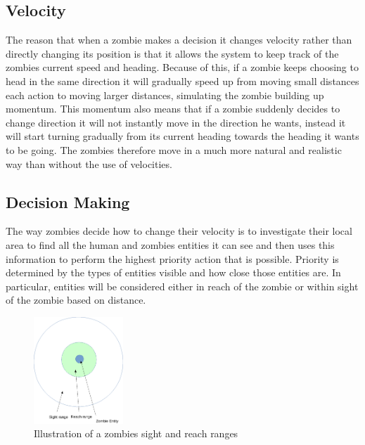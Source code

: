 \subsection{Velocity}
The reason that when a zombie makes a decision it changes velocity rather than directly changing its position is that it allows the system to keep track of the zombies current speed and heading. Because of this, if a zombie keeps choosing to head in the same direction it will gradually speed up from moving small distances each action to moving larger distances, simulating the zombie building up momentum. This momentum also means that if a zombie suddenly decides to change direction it will not instantly move in the direction he wants, instead it will start turning gradually from its current heading towards the heading it wants to be going. The zombies therefore move in a much more natural and realistic way than without the use of velocities.

\subsection{Decision Making}
The way zombies decide how to change their velocity is to investigate their local area to find all the human and zombies entities it can see and then uses this information to perform the highest priority action that is possible. Priority is determined by the types of entities visible and how close those entities are. In particular, entities will be considered either in reach of the zombie or within sight of the zombie based on distance.
\begin{figure}[h]
  \centering
  \includegraphics[width=0.3\textwidth]{img/zombie_range.png}
\caption{Illustration of a zombies sight and reach ranges}
    \label{fig:Illustration of a zombies sight and reach ranges}
\end{figure}

